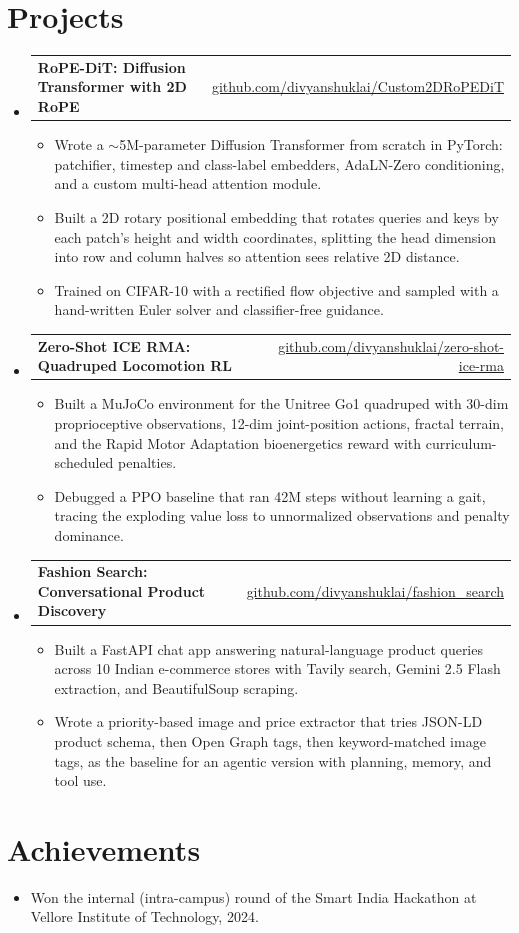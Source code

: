 \documentclass[letterpaper,11pt]{article}
\makeatletter
\newcommand{\resumeItem}[1]{
  \item\small{
    {#1 \vspace{-2pt}}
  }
}
\newcommand{\resumeProjectHeading}[2]{
    \item
    \begin{tabular*}{0.97\textwidth}{l@{\extracolsep{\fill}}r}
      \small#1 & \small#2 \\
    \end{tabular*}\vspace{-5pt}
}
\newcommand{\resumeSubHeadingListStart}{\begin{itemize}[leftmargin=0.15in, label={}, itemsep=0pt]}
\newcommand{\resumeSubHeadingListEnd}{\end{itemize}\vspace{-8pt}}
\newcommand{\resumeItemListStart}{\begin{itemize}[itemsep=-2.2pt]}
\newcommand{\resumeItemListEnd}{\end{itemize}\vspace{-6pt}}
\makeatother
\begin{document}
\section{Projects}
    \resumeSubHeadingListStart

      \resumeProjectHeading
          {\textbf{RoPE-DiT: Diffusion Transformer with 2D RoPE}}{\href{https://github.com/divyanshuklai/Custom2DRoPEDiT}{\uline{github.com/divyanshuklai/Custom2DRoPEDiT}}}
          \resumeItemListStart
            \resumeItem{Wrote a $\sim$5M-parameter Diffusion Transformer from scratch in PyTorch: patchifier, timestep and class-label embedders, AdaLN-Zero conditioning, and a custom multi-head attention module.}
            \resumeItem{Built a 2D rotary positional embedding that rotates queries and keys by each patch's height and width coordinates, splitting the head dimension into row and column halves so attention sees relative 2D distance.}
            \resumeItem{Trained on CIFAR-10 with a rectified flow objective and sampled with a hand-written Euler solver and classifier-free guidance.}
          \resumeItemListEnd

      \resumeProjectHeading
          {\textbf{Zero-Shot ICE RMA: Quadruped Locomotion RL}}{\href{https://github.com/divyanshuklai/zero-shot-ice-rma}{\uline{github.com/divyanshuklai/zero-shot-ice-rma}}}
          \resumeItemListStart
            \resumeItem{Built a MuJoCo environment for the Unitree Go1 quadruped with 30-dim proprioceptive observations, 12-dim joint-position actions, fractal terrain, and the Rapid Motor Adaptation bioenergetics reward with curriculum-scheduled penalties.}
            \resumeItem{Debugged a PPO baseline that ran 42M steps without learning a gait, tracing the exploding value loss to unnormalized observations and penalty dominance.}
          \resumeItemListEnd

      \resumeProjectHeading
          {\textbf{Fashion Search: Conversational Product Discovery}}{\href{https://github.com/divyanshuklai/fashion_search}{\uline{github.com/divyanshuklai/fashion\_search}}}
          \resumeItemListStart
            \resumeItem{Built a FastAPI chat app answering natural-language product queries across 10 Indian e-commerce stores with Tavily search, Gemini 2.5 Flash extraction, and BeautifulSoup scraping.}
            \resumeItem{Wrote a priority-based image and price extractor that tries JSON-LD product schema, then Open Graph tags, then keyword-matched image tags, as the baseline for an agentic version with planning, memory, and tool use.}
          \resumeItemListEnd

    \resumeSubHeadingListEnd

\section{Achievements}
  \resumeSubHeadingListStart
    \resumeItem{Won the internal (intra-campus) round of the Smart India Hackathon at Vellore Institute of Technology, 2024.}
  \resumeSubHeadingListEnd
\end{document}
